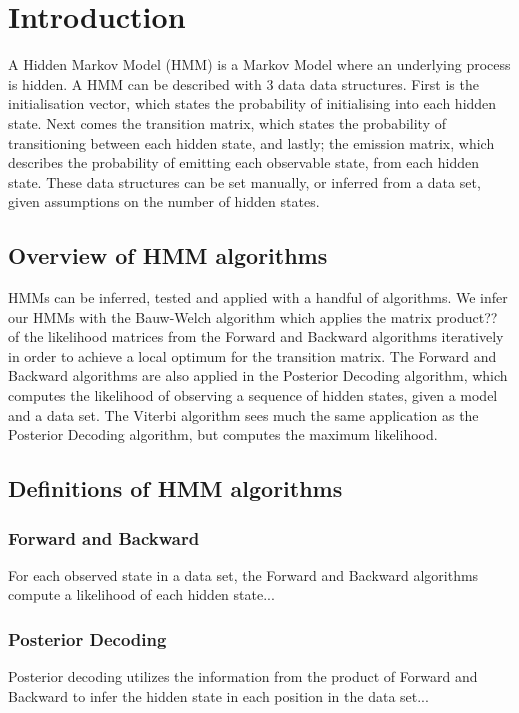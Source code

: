 \section{Introduction}
A Hidden Markov Model (HMM) is a Markov Model where an underlying process is hidden. A HMM can be described with 3 data data structures. First is the initialisation vector, which states the probability of initialising into each hidden state. Next comes the transition matrix, which states the probability of transitioning between each hidden state, and lastly; the emission matrix, which describes the probability of emitting each observable state, from each hidden state. These data structures can be set manually, or inferred from a data set, given assumptions on the number of hidden states.

\subsection{Overview of HMM algorithms}
HMMs can be inferred, tested and applied with a handful of algorithms. We infer our HMMs with the Bauw-Welch algorithm which applies the matrix product?? of the likelihood matrices from the Forward and Backward algorithms iteratively in order to achieve a local optimum for the transition matrix. The Forward and Backward algorithms are also applied in the Posterior Decoding algorithm, which computes the likelihood of observing a sequence of hidden states, given a model and a data set. The Viterbi algorithm sees much the same application as the Posterior Decoding algorithm, but computes the maximum likelihood.



\subsection{Definitions of HMM algorithms}
\subsubsection{Forward and Backward}
For each observed state in a data set, the Forward and Backward algorithms compute a likelihood of each hidden state...

\subsubsection{Posterior Decoding}
Posterior decoding utilizes the information from the product of Forward and Backward to infer the hidden state in each position in the data set...

